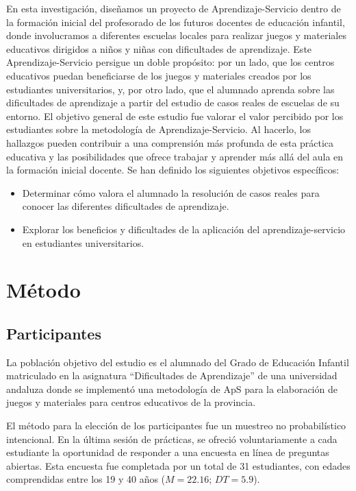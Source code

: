 \documentclass[spanish]{textolivre}
\begin{document}
En esta investigación, diseñamos un proyecto de Aprendizaje-Servicio dentro de la formación inicial del profesorado de los futuros docentes de educación infantil, donde involucramos a diferentes escuelas locales para realizar juegos y materiales educativos dirigidos a niños y niñas con dificultades de aprendizaje. Este Aprendizaje-Servicio persigue un doble propósito: por un lado, que los centros educativos puedan beneficiarse de los juegos y materiales creados por los estudiantes universitarios, y, por otro lado, que el alumnado aprenda sobre las dificultades de aprendizaje a partir del estudio de casos reales de escuelas de su entorno. El objetivo general de este estudio fue valorar el valor percibido por los estudiantes sobre la metodología de Aprendizaje-Servicio. Al hacerlo, los hallazgos pueden contribuir a una comprensión más profunda de esta práctica educativa y las posibilidades que ofrece trabajar y aprender más allá del aula en la formación inicial docente. Se han definido los siguientes objetivos específicos: 
\begin{itemize}
    \item Determinar cómo valora el alumnado la resolución de casos reales para conocer las diferentes dificultades de aprendizaje.
    \item Explorar los beneficios y dificultades de la aplicación del aprendizaje-servicio en estudiantes universitarios.
\end{itemize}


\section{Método}
\subsection{Participantes}

La población objetivo del estudio es el alumnado del Grado de Educación Infantil matriculado en la asignatura “Dificultades de Aprendizaje” de una universidad andaluza donde se implementó una metodología de ApS para la elaboración de juegos y materiales para centros educativos de la provincia.

El método para la elección de los participantes fue un muestreo no probabilístico intencional. En la última sesión de prácticas, se ofreció voluntariamente a cada estudiante la oportunidad de responder a una encuesta en línea de preguntas abiertas. Esta encuesta fue completada por un total de 31 estudiantes, con edades comprendidas entre los 19 y 40 años ($M = 22.16$; $DT = 5.9$).
\end{document}
